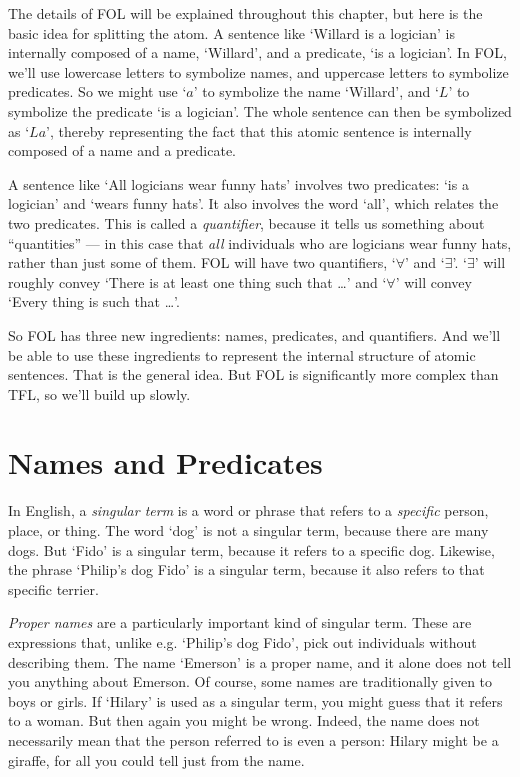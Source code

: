 The details of FOL will be explained throughout this chapter, but here is the basic idea for splitting the atom.  A sentence like `Willard is a logician' is internally composed of a name, `Willard', and a predicate, `\blank is a logician'.  In FOL, we'll use lowercase letters to symbolize names, and uppercase letters to symbolize predicates.  So we might use `$a$' to symbolize the name `Willard', and `$L$' to symbolize the predicate `\blank is a logician'.  The whole sentence can then be symbolized as `$La$', thereby representing the fact that this atomic sentence is internally composed of a name and a predicate.

A sentence like `All logicians wear funny hats' involves two predicates: `\blank is a logician' and `\blank wears funny hats'.  It also involves the word `all', which relates the two predicates.  This is called a \emph{quantifier}, because it tells us something about ``quantities'' --- in this case that \emph{all} individuals who are logicians wear funny hats, rather than just some of them.  FOL will have two quantifiers, `$\forall$' and `$\exists$'.  `$\exists$' will roughly convey `There is at least one thing such that \ldots' and `$\forall$' will convey `Every thing is such that \ldots'.

So FOL has three new ingredients: names, predicates, and quantifiers.  And we'll be able to use these ingredients to represent the internal structure of atomic sentences. That is the general idea. But FOL is significantly more complex than TFL, so we'll build up slowly.


\section{Names and Predicates}\label{s:NamesPredicates}
In English, a \emph{singular term} is a word or phrase that refers to a \emph{specific} person, place, or thing. The word `dog' is not a singular term, because there are many dogs. But `Fido' is a singular term, because it refers to a specific dog. Likewise, the phrase `Philip's dog Fido' is a singular term, because it also refers to that specific terrier.

\emph{Proper names} are a particularly important kind of singular term. These are expressions that, unlike e.g. `Philip's dog Fido', pick out individuals without describing them. The name `Emerson' is a proper name, and it alone does not tell you anything about Emerson. Of course, some names are traditionally given to boys or girls. If `Hilary' is used as a singular term, you might guess that it refers to a woman. But then again you might be wrong. Indeed, the name does not necessarily mean that the person referred to is even a person: Hilary might be a giraffe, for all you could tell just from the name.

